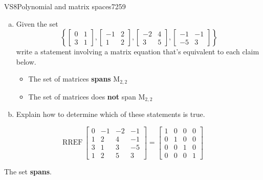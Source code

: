 \begin{exercise}{VS8}{Polynomial and matrix spaces}{7259} 
\begin{exerciseStatement} 

\begin{enumerate}[(a)]
\item  

 Given the set \[\left\{ \left[\begin{array}{cc}
0 & 1 \\
3 & 1
\end{array}\right] , \left[\begin{array}{cc}
-1 & 2 \\
1 & 2
\end{array}\right] , \left[\begin{array}{cc}
-2 & 4 \\
3 & 5
\end{array}\right] , \left[\begin{array}{cc}
-1 & -1 \\
-5 & 3
\end{array}\right] \right\}\] write a statement involving a matrix equation that's equivalent to each claim below. 

 

\begin{itemize}
\item  

 The set of matrices \textbf{spans} \(\mathrm{M}_{2,2}\) 

 
\item  

 The set of matrices does \textbf{not} span \(\mathrm{M}_{2,2}\) 

 
\end{itemize}

     
\item  

 Explain how to determine which of these statements is true. 

 
\end{enumerate}

     \end{exerciseStatement}
 \begin{exerciseAnswer} 

 \[
\mathrm{RREF}\, \left[\begin{array}{cccc}
0 & -1 & -2 & -1 \\
1 & 2 & 4 & -1 \\
3 & 1 & 3 & -5 \\
1 & 2 & 5 & 3
\end{array}\right] = \left[\begin{array}{cccc}
1 & 0 & 0 & 0 \\
0 & 1 & 0 & 0 \\
0 & 0 & 1 & 0 \\
0 & 0 & 0 & 1
\end{array}\right]
            \] 

 

 The set \textbf{spans}. 

 \end{exerciseAnswer}
 \end{exercise}


